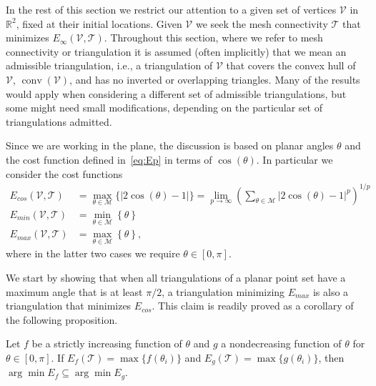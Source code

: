 \documentclass[final]{siamltex}
\newcommand{\Real}{\ensuremath{\mathbb{R}}} \newcommand{\meshM}{\ensuremath{\mathcal{M}}} \newcommand{\meshV}{\ensuremath{\mathcal{V}}} \newcommand{\meshT}{\ensuremath{\mathcal{T}}} \newcommand{\interior}{\ensuremath{\mathrm{Int}}}
\DeclareMathOperator{\conv}{conv}
\begin{document}
In the rest of this section we restrict our attention to a given set
of vertices $\meshV$ in $\Real^{2}$, fixed at their initial locations.
Given $\meshV$ we seek the mesh connectivity $\meshT$ that minimizes
$E_{\infty}(\meshV, \meshT)$. Throughout this section, where we refer
to mesh connectivity or triangulation it is assumed (often implicitly)
that we mean an admissible triangulation, i.e., a triangulation of
$\meshV$ that covers the convex hull of $\meshV$, $\conv(\meshV)$, and
has no inverted or overlapping triangles.  Many of the results would
apply when considering a different set of admissible triangulations,
but some might need small modifications, depending on the particular
set of triangulations admitted.

Since we are working in the plane, the discussion is based on planar
angles $\theta$ and the cost function defined in~\eqref{eq:Ep} in
terms of $\cos(\theta)$.  In particular we consider the cost functions
\begin{align*}
E_{cos}\left(\meshV, \meshT\right) &= 
    \max_{\theta \in \meshM} \big\{\left\lvert 2 \cos(\theta)
      - 1\right\rvert\big\}  = \lim_{p\rightarrow\infty}
      \left(\sum_{\theta \in \meshM} \left\lvert 2 \cos\left(\theta\right)
      - 1\right\rvert^p\right)^{1/p} \\
E_{min}\left(\meshV, \meshT\right) &= \min_{\theta \in \meshM}
  \left\{\theta\right\} \\
E_{max}\left(\meshV, \meshT\right) &= \max_{\theta \in \meshM}
  \left\{\theta\right\},
\end{align*}
where in the latter two cases we require $\theta \in [0, \pi]$.


We start by showing that when all triangulations of a planar point set
have a maximum angle that is at least $\pi/2$, a triangulation
minimizing $E_{max}$ is also a triangulation that minimizes $E_{cos}$.
This claim is readily proved as a corollary of the following
proposition.

\bigskip

\begin{proposition}
  \label{prop:trngfns} Let $f$ be a strictly increasing function of $\theta$
  and $g$ a nondecreasing function of $\theta$ for $\theta \in [0,
  \pi]$.  If $E_{f}(\meshT) = \max \{f(\theta_i)\}$ and $E_{g}(\meshT)
  = \max \{g(\theta_i)\}$, then $\arg\min E_{f} \subseteq \arg\min
  E_{g}$.
\end{proposition}
\end{document}
